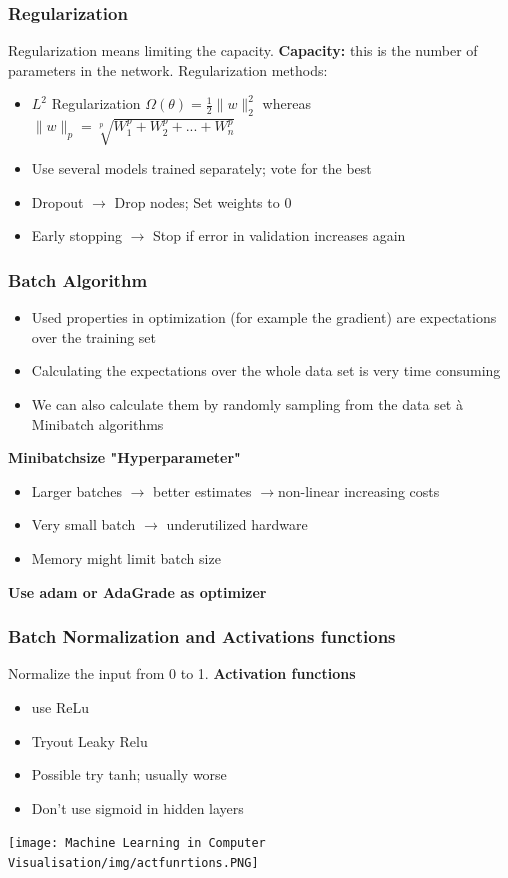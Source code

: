 \documentclass[x11names,11pt,a4paper]{article}
\theoremstyle{definition}
\begin{document}
\subsubsection{Regularization}
Regularization means limiting the capacity.
\textbf{Capacity: }this is the number of parameters in the network.
Regularization methods:
\begin{itemize}
    \item $L^2$ Regularization $\Omega(\theta) = \frac{1}{2}\parallel w\parallel_{2}^2$ whereas $\parallel w\parallel_p = \sqrt[p]{W_1^p+W_2^p+...+W_n^p}$ 
    \item Use several models trained separately; vote for the best
    \item Dropout $\rightarrow$ Drop nodes; Set weights to 0
    \item Early stopping $\rightarrow$ Stop if error in validation increases again
\end{itemize}

\subsubsection{Batch Algorithm}
\begin{itemize}
    \item Used properties in optimization (for example the gradient) are expectations over the training set
    \item Calculating the expectations over the whole data set is very time consuming
    \item We can also calculate them by randomly sampling from the data set à Minibatch algorithms
\end{itemize}
\textbf{Minibatchsize "Hyperparameter"}
\begin{itemize}
    \item Larger batches $\rightarrow$ better estimates $\rightarrow$non-linear increasing costs
    \item Very small batch $\rightarrow$ underutilized hardware
    \item Memory might limit batch size
\end{itemize}
\textbf{Use adam or AdaGrade as optimizer}
\subsubsection{Batch Normalization and Activations functions}
Normalize the input from 0 to 1.
\textbf{Activation functions}
\begin{itemize}
    \item use ReLu
    \item Tryout Leaky Relu
    \item Possible try tanh; usually worse
    \item Don't use sigmoid in hidden layers
\end{itemize}
\begin{center}
	\texttt{[image: Machine Learning in Computer Visualisation/img/actfunrtions.PNG]}
\end{center}
\end{document}
